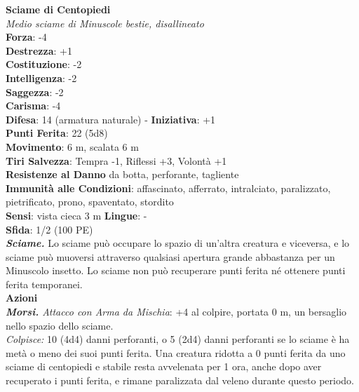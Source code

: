 \begin{multicols}{2}
\medskip\textbf{Sciame di Centopiedi}\\
\emph{Medio sciame di Minuscole bestie, disallineato}\\
\textbf{Forza}: -4\\
\textbf{Destrezza}: +1\\
\textbf{Costituzione}: -2\\
\textbf{Intelligenza}: -2\\
\textbf{Saggezza}: -2\\
\textbf{Carisma}: -4\\
\textbf{Difesa}: 14 (armatura naturale) - \textbf{Iniziativa}: +1\\
\textbf{Punti Ferita}: 22 (5d8)\\
\textbf{Movimento}: 6 m, scalata 6 m\\
\textbf{Tiri Salvezza}: Tempra -1, Riflessi +3, Volontà +1\\
\textbf{Resistenze al Danno} da botta, perforante, tagliente\\
\textbf{Immunità alle Condizioni}: affascinato, afferrato, intralciato, paralizzato, pietrificato, prono, spaventato, stordito\\
\textbf{Sensi}: vista cieca 3 m
\textbf{Lingue}: -\\
\textbf{Sfida}: 1/2 (100 PE)\smallskip\\
\emph{\textbf{Sciame.}} Lo sciame può occupare lo spazio di un'altra creatura e viceversa, e lo sciame può muoversi attraverso qualsiasi apertura grande abbastanza per un Minuscolo insetto. Lo sciame non può recuperare punti ferita né ottenere punti ferita temporanei.\\
\smallskip\textbf{Azioni}\\
\emph{\textbf{Morsi.} Attacco con Arma da Mischia}: +4 al colpire, portata 0 m, un bersaglio nello spazio dello sciame.\\
\emph{Colpisce:} 10 (4d4) danni perforanti, o 5 (2d4) danni perforanti se lo sciame è ha metà o meno dei suoi punti ferita. Una creatura ridotta a 0 punti ferita da uno sciame di centopiedi e stabile resta avvelenata per 1 ora, anche dopo aver recuperato i punti ferita, e rimane paralizzata dal veleno durante questo periodo.\\


\end{multicols}
